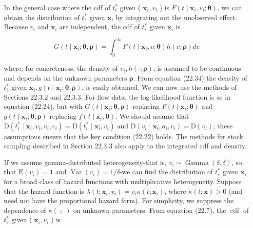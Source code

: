 \documentclass[10pt]{article}
\begin{document}
In the general case where the cdf of $t_{i}^{*}$ given ( $\mathbf{x}_{i}, v_{i}$ ) is $F\left(t \mid \mathbf{x}_{i}, v_{i} ; \boldsymbol{\theta}\right)$, we can obtain the distribution of $t_{i}^{*}$ given $\mathbf{x}_{i}$ by integrating out the unobserved effect. Because $v_{i}$ and $\mathbf{x}_{i}$ are independent, the cdf of $t_{i}^{*}$ given $\mathbf{x}_{i}$ is


\begin{equation*}
G\left(t \mid \mathbf{x}_{i} ; \boldsymbol{\theta}, \boldsymbol{\rho}\right)=\int_{0}^{\infty} F\left(t \mid \mathbf{x}_{i}, v ; \boldsymbol{\theta}\right) h(v ; \boldsymbol{\rho}) d v \tag{22.34}
\end{equation*}


where, for concreteness, the density of $v_{i}, h(\cdot ; \boldsymbol{\rho})$, is assumed to be continuous and depends on the unknown parameters $\boldsymbol{\rho}$. From equation (22.34) the density of $t_{i}^{*}$ given $\mathbf{x}_{i}, g\left(t \mid \mathbf{x}_{i} ; \boldsymbol{\theta}, \boldsymbol{\rho}\right)$, is easily obtained. We can now use the methods of Sections 22.3.2 and 22.3.3. For flow data, the log-likelihood function is as in equation (22.24), but with $G\left(t \mid \mathbf{x}_{i} ; \boldsymbol{\theta}, \boldsymbol{\rho}\right)$ replacing $F\left(t \mid \mathbf{x}_{i} ; \boldsymbol{\theta}\right)$ and $g\left(t \mid \mathbf{x}_{i} ; \boldsymbol{\theta}, \boldsymbol{\rho}\right)$ replacing $f\left(t \mid \mathbf{x}_{i} ; \boldsymbol{\theta}\right)$. We should assume that $\mathrm{D}\left(t_{i}^{*} \mid \mathbf{x}_{i}, v_{i}, a_{i}, c_{i}\right)=\mathrm{D}\left(t_{i}^{*} \mid \mathbf{x}_{i}, v_{i}\right)$ and $\mathrm{D}\left(v_{i} \mid \mathbf{x}_{i}, a_{i}, c_{i}\right)=\mathrm{D}\left(v_{i}\right)$; these assumptions ensure that the key condition (22.22) holds. The methods for stock sampling described in Section 22.3.3 also apply to the integrated cdf and density.

If we assume gamma-distributed heterogeneity-that is, $v_{i} \sim \operatorname{Gamma}(\delta, \delta)$, so that $\mathrm{E}\left(v_{i}\right)=1$ and $\operatorname{Var}\left(v_{i}\right)=1 / \delta$-we can find the distribution of $t_{i}^{*}$ given $\mathbf{x}_{i}$ for a broad class of hazard functions with multiplicative heterogeneity. Suppose that the hazard function is $\lambda\left(t ; \mathbf{x}_{i}, v_{i}\right)=v_{i} \kappa\left(t ; \mathbf{x}_{i}\right)$, where $\kappa(t ; \mathbf{x})>0$ (and need not have the proportional hazard form). For simplicity, we suppress the dependence of $\kappa(\cdot ; \cdot)$ on unknown parameters. From equation (22.7), the $\operatorname{cdf}$ of $t_{i}^{*}$ given ( $\mathbf{x}_{i}, v_{i}$ ) is
\end{document}
